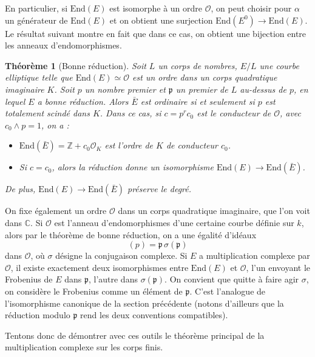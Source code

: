 \documentclass[11pt,a4paper]{article}
\newcommand{\Z}{\mathbb{Z}}
\newcommand{\C}{\mathbb{C}}
\renewcommand{\O}{\mathcal{O}}
\newcommand{\vers}{\longrightarrow}
\newcommand{\End}{\mathrm{End}}
\renewcommand{\frak}{\mathfrak}
\newtheorem*{thm}{Théorème}
\theoremstyle{definition}
\begin{document}
En particulier, si $\End(E)$ est isomorphe à un ordre $\O$, on peut choisir pour $\alpha$ un générateur de $\End(E)$ et on obtient une surjection $\End(E^0)\vers \End(E).$ Le résultat suivant montre en fait que dans ce cas, on obtient une bijection entre les anneaux d'endomorphismes.

\begin{thm}[Bonne réduction]

Soit $L$ un corps de nombres, $E/L$ une courbe elliptique telle que $\End(E)\simeq \O$ est un ordre dans un corps quadratique imaginaire $K$. Soit $p$ un nombre premier et $\frak p$ un premier de $L$ au-dessus de $p$, en lequel $E$ a bonne réduction. Alors $\bar{E}$ est ordinaire si et seulement si $p$ est totalement scindé dans $K$. Dans ce cas, si $c=p^r c_0$ est le conducteur de $\O$, avec $c_0 \wedge p = 1$, on a :

\begin{itemize}
\item[(i)] $\End(\bar{E})=\Z+c_0 \O_K$ est l'ordre de $K$ de conducteur $c_0$.
\item[(ii)] Si $c=c_0$, alors la réduction donne un isomorphisme $\End(E)\vers\End(\bar{E})$.
\end{itemize}
De plus, $\End(E)\vers\End(\bar{E})$ préserve le degré.

\end{thm}


On fixe également un ordre $\O$ dans un corps quadratique imaginaire, que l'on voit dans $\C$. Si $\O$ est l'anneau d'endomorphismes d'une certaine courbe définie sur $k$, alors par le théorème de bonne réduction, on a une égalité d'idéaux
$$(p) = \frak{p}\, \sigma( \frak{p})$$
dans $\O$, où $\sigma$ désigne la conjugaison complexe. Si $E$ a multiplication complexe par $\O$, il existe exactement deux isomorphismes entre $\End(E)$ et $\O$, l'un envoyant le Frobenius de $E$ dans $\frak p$, l'autre dans $\sigma(\frak p)$. On convient que quitte à faire agir $\sigma$, on considère le Frobenius comme un élément de $\frak p$. C'est l'analogue de l'isomorphisme canonique de la section précédente (notons d'ailleurs que la réduction modulo $\frak p$ rend les deux conventions compatibles).


Tentons donc de démontrer avec ces outils le théorème principal de la multiplication complexe sur les corps finis.
\end{document}
